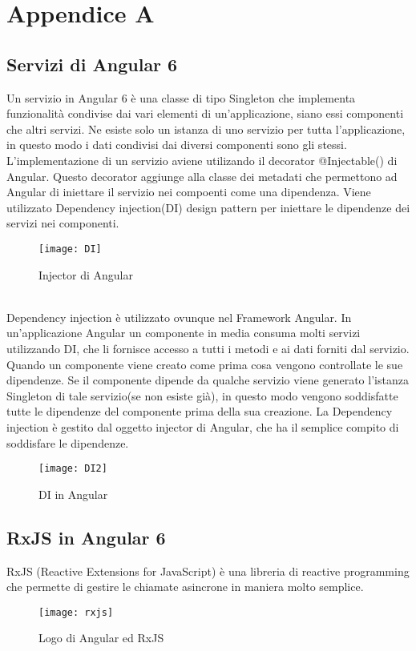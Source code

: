 
\chapter{Appendice A}
\section{Servizi di Angular 6}
 Un servizio in Angular 6 è una classe di tipo Singleton che implementa funzionalità condivise dai vari elementi di un’applicazione, siano essi componenti che altri servizi.
Ne esiste solo un istanza di uno servizio per tutta l'applicazione, in questo modo i dati condivisi dai diversi componenti sono gli stessi.
\\

L'implementazione di un servizio aviene utilizando il decorator @Injectable() di Angular. Questo decorator aggiunge alla classe dei metadati che permettono ad Angular di iniettare il servizio nei compoenti come una dipendenza. Viene utilizzato Dependency injection(DI) design pattern per iniettare le dipendenze dei servizi nei componenti. 
\begin{figure}[!h] 
	\centering 
	\texttt{[image: DI]} 
	\caption{Injector di Angular}
\end{figure}
\\

Dependency injection è utilizzato ovunque nel Framework Angular. In un'applicazione Angular un componente in media consuma molti servizi utilizzando DI, che li fornisce accesso a tutti i metodi e ai dati forniti dal servizio. 
\\ 

Quando un componente viene creato come prima cosa vengono controllate le sue dipendenze. Se il componente dipende da qualche servizio viene generato l'istanza Singleton di tale servizio(se non esiste già), in questo modo vengono soddisfatte tutte le dipendenze del componente prima della sua creazione. 
La Dependency injection è gestito dal oggetto injector di Angular, che ha il semplice compito di soddisfare le dipendenze. 
\begin{figure}[!ht] 
	\centering 
	\texttt{[image: DI2]} 
	\caption{DI in Angular}
\end{figure}
\section{RxJS in Angular 6}
RxJS (Reactive Extensions for JavaScript) è una libreria di reactive programming che permette di gestire le chiamate asincrone in maniera molto semplice.
\begin{figure}[!ht] 
	\centering 
	\texttt{[image: rxjs]} 
	\caption{Logo di Angular ed RxJS}
\end{figure}